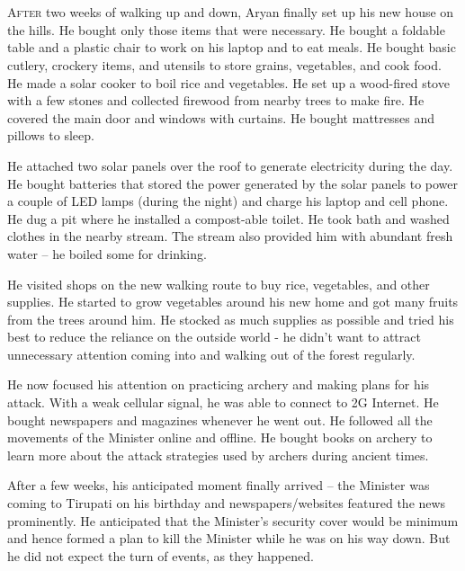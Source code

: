 \chapter{}

\lettrine{A}{fter} two weeks of walking up and down, Aryan finally set up his new house on
the hills. He bought only those items that were necessary. He bought a foldable
table and a plastic chair to work on his laptop and to eat meals. He bought
basic cutlery, crockery items, and utensils to store grains, vegetables, and
cook food. He made a solar cooker to boil rice and vegetables. He set up a
wood-fired stove with a few stones and collected firewood from nearby trees to
make fire. He covered the main door and windows with curtains. He bought
mattresses and pillows to sleep.

He attached two solar panels over the roof to generate electricity during the
day. He bought batteries that stored the power generated by the solar panels to
power a couple of LED lamps (during the night) and charge his laptop and cell
phone. He dug a pit where he installed a compost-able toilet. He took bath and
washed clothes in the nearby stream. The stream also provided him with abundant
fresh water – he boiled some for drinking.

He visited shops on the new walking route to buy rice, vegetables, and other
supplies. He started to grow vegetables around his new home and got many fruits
from the trees around him. He stocked as much supplies as possible and tried his
best to reduce the reliance on the outside world - he didn't want to attract
unnecessary attention coming into and walking out of the forest regularly.

He now focused his attention on practicing archery and making plans for his
attack. With a weak cellular signal, he was able to connect to 2G Internet. He
bought newspapers and magazines whenever he went out. He followed all the
movements of the Minister online and offline. He bought books on archery to
learn more about the attack strategies used by archers during ancient times.

After a few weeks, his anticipated moment finally arrived – the Minister was
coming to Tirupati on his birthday and newspapers/websites featured the news
prominently. He anticipated that the Minister's security cover would be minimum
and hence formed a plan to kill the Minister while he was on his way down. But
he did not expect the turn of events, as they happened.